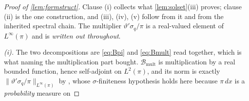 \begin{proof}[Proof of \cref{lem:formstruct}]
Clause (i) collects what \cref{lem:solset}(iii) proves; clause (ii) is the one construction, and (iii),
(iv), (v) follow from it and from the inherited spectral chain. The multiplier $\vartheta'\sigma_q/\pi$ is
a real-valued element of $L^{\infty}(\pi)$ and is \emph{written out throughout}.

\emph{(i).} The two decompositions are \eqref{eq:Bpi} and \eqref{eq:Bmult} read together, which is what
naming the multiplication part bought. $\mathcal B_{\mathrm{mult}}$ is multiplication by a real bounded
function, hence self-adjoint on $L^{2}(\pi)$, and its norm is exactly
$\|\vartheta'\sigma_q/\pi\|_{L^\infty(\pi)}$ by \citet[Thm.~II.1.5]{conway1990}, whose
$\sigma$-finiteness hypothesis holds here because $\pi\,dx$ is a \emph{probability} measure on

\end{proof}
